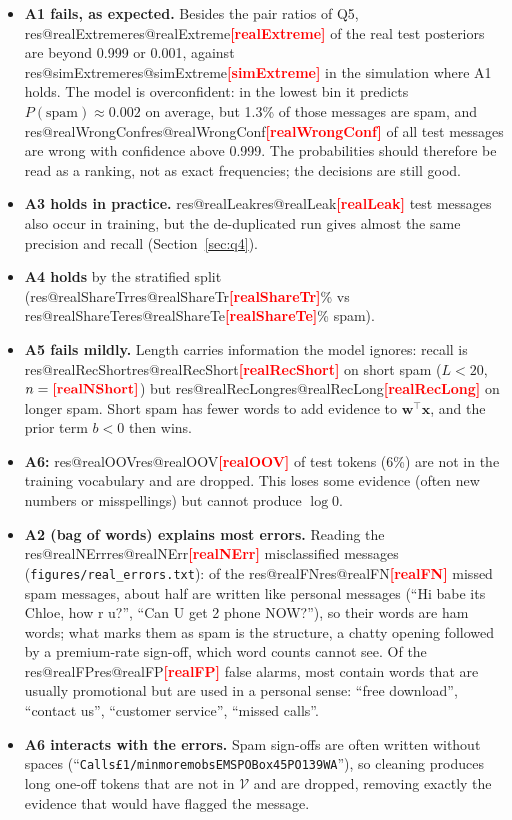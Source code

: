 \documentclass[11pt]{article}
\makeatletter
\newcommand{\fillin}[1]{\textcolor{red}{\textbf{[#1]}}}
\newcommand{\res}[1]{\ifcsname res@#1\endcsname\csname res@#1\endcsname\else\fillin{#1}\fi}
\theoremstyle{plain}
\newcommand{\V}{\mathcal{V}}
\newcommand{\bx}{\mathbf{x}}
\newcommand{\bw}{\mathbf{w}}
\makeatother
\begin{document}
\begin{itemize}[leftmargin=*,itemsep=2pt]
\item \textbf{A1 fails, as expected.} Besides the pair ratios of Q5, \res{realExtreme} of the real test
posteriors are beyond 0.999 or 0.001, against \res{simExtreme} in the simulation where A1 holds.
The model is overconfident: in the lowest bin it predicts $P(\text{spam})\approx0.002$ on average,
but 1.3\% of those messages are spam, and \res{realWrongConf} of all test messages are wrong with
confidence above 0.999. The probabilities should therefore be read as a ranking, not as exact
frequencies; the decisions are still good.
\item \textbf{A3 holds in practice.} \res{realLeak} test messages also occur in training, but the
de-duplicated run gives almost the same precision and recall (Section~\ref{sec:q4}).
\item \textbf{A4 holds} by the stratified split (\res{realShareTr}\% vs \res{realShareTe}\% spam).
\item \textbf{A5 fails mildly.} Length carries information the model ignores: recall is
\res{realRecShort} on short spam ($L<20$, $n=\res{realNShort}$) but \res{realRecLong} on longer spam.
Short spam has fewer words to add evidence to $\bw^\top\bx$, and the prior term $b<0$ then wins.
\item \textbf{A6:} \res{realOOV} of test tokens (6\%) are not in the training vocabulary and are
dropped. This loses some evidence (often new numbers or misspellings) but cannot produce $\log0$.
\item \textbf{A2 (bag of words) explains most errors.} Reading the \res{realNErr} misclassified
messages (\texttt{figures/real\_errors.txt}): of the \res{realFN} missed spam messages, about half are
written like personal messages (``Hi babe its Chloe, how r u?'', ``Can U get 2 phone NOW?''), so their
words are ham words; what marks them as spam is the structure, a chatty opening followed by a
premium-rate sign-off, which word counts cannot see. Of the \res{realFP} false alarms, most contain
words that are usually promotional but are used in a personal sense: ``free download'', ``contact us'',
``customer service'', ``missed calls''.
\item \textbf{A6 interacts with the errors.} Spam sign-offs are often written without spaces
(``\texttt{Calls\pounds1/min\allowbreak moremobs\allowbreak EMSPOBox\allowbreak 45PO139WA}''), so cleaning produces long one-off tokens that are not
in $\V$ and are dropped, removing exactly the evidence that would have flagged the message.

\end{itemize}
\end{document}
